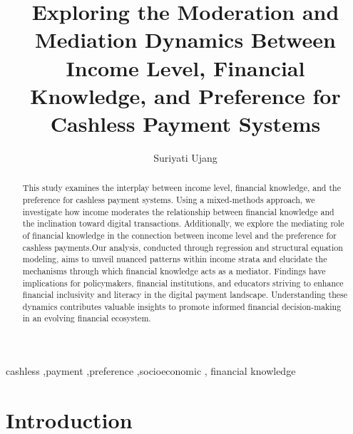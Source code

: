 \documentclass[
  super,
  preprint,
  3p]{elsarticle}
\begin{document}
\begin{frontmatter}
\title{Exploring the Moderation and Mediation Dynamics Between Income
Level, Financial Knowledge, and Preference for Cashless Payment Systems}
\author[1]{Suriyati Ujang%
%
}



        
\begin{abstract}
This study examines the interplay between income level, financial
knowledge, and the preference for cashless payment systems. Using a
mixed-methods approach, we investigate how income moderates the
relationship between financial knowledge and the inclination toward
digital transactions. Additionally, we explore the mediating role of
financial knowledge in the connection between income level and the
preference for cashless payments.Our analysis, conducted through
regression and structural equation modeling, aims to unveil nuanced
patterns within income strata and elucidate the mechanisms through which
financial knowledge acts as a mediator. Findings have implications for
policymakers, financial institutions, and educators striving to enhance
financial inclusivity and literacy in the digital payment landscape.
Understanding these dynamics contributes valuable insights to promote
informed financial decision-making in an evolving financial ecosystem.
\end{abstract}





\begin{keyword}
    cashless \sep payment \sep preference \sep socioeconomic \sep 
    financial knowledge
\end{keyword}
\end{frontmatter}
    \ifdefined\Shaded\renewenvironment{Shaded}{\begin{tcolorbox}[breakable, frame hidden, borderline west={3pt}{0pt}{shadecolor}, interior hidden, enhanced, boxrule=0pt, sharp corners]}{\end{tcolorbox}}\fi

\hypertarget{introduction}{%
\section{Introduction}\label{introduction}}
\end{document}
